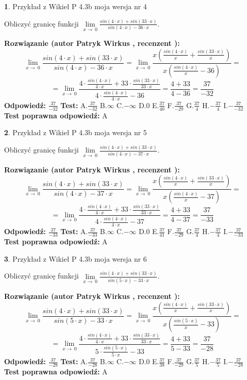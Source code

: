 \documentclass[12pt, a4paper]{article}
\theoremstyle{definition} %
\newtheorem{zad}{}
\newcommand{\zadStart}[1]{\begin{zad}#1\newline}
\newcommand{\zadStop}{\end{zad}}
\newcommand{\rozwStart}[2]{\noindent \textbf{Rozwiązanie (autor #1 , recenzent #2): }\newline}
\newcommand{\rozwStop}{\newline}
\newcommand{\odpStart}{\noindent \textbf{Odpowiedź:}\newline}
\newcommand{\odpStop}{\newline}
\newcommand{\testStart}{\noindent \textbf{Test:}\newline}
\newcommand{\testStop}{\newline}
\newcommand{\kluczStart}{\noindent \textbf{Test poprawna odpowiedź:}\newline}
\newcommand{\kluczStop}{\newline}
\begin{document}
\zadStart{Przykład z Wikieł P 4.3b moja wersja nr 4}


Obliczyć granicę funkcji $\lim\limits_{x\to\ 0}\frac{sin(4 \cdot x)+sin(33 \cdot x)}{sin(4 \cdot x)-36 \cdot x}$.
\zadStop
\rozwStart{Patryk Wirkus}{}
$$\lim\limits_{x\to\ 0}\frac{sin(4 \cdot x)+sin(33 \cdot x)}{sin(4 \cdot x)-36 \cdot x}=\lim\limits_{x\to\ 0}\frac{x(\frac{sin(4 \cdot x)}{x}+\frac{sin(33 \cdot x)}{x})}{x(\frac{sin(4 \cdot x)}{x}-36)}=$$
$$=\lim\limits_{x\to\ 0}\frac{4 \cdot \frac{sin(4 \cdot x)}{4 \cdot x}+33 \cdot \frac{sin(33 \cdot x)}{33 \cdot x}}{4 \cdot \frac{sin(4 \cdot x)}{4 \cdot x}-36}=\frac{4+33}{4-36} = \frac{37}{-32}$$
\rozwStop
\odpStart
$\frac{37}{-32}$
\odpStop
\testStart
A.$\frac{37}{-32}$
B.$\infty$
C.$-\infty$
D.$0$
E.$\frac{37}{40}$
F.$\frac{37}{-29}$
G.$\frac{37}{4}$
H.$-\frac{37}{4}$
I.$-\frac{37}{-32}$
\testStop
\kluczStart
A
\kluczStop



\zadStart{Przykład z Wikieł P 4.3b moja wersja nr 5}


Obliczyć granicę funkcji $\lim\limits_{x\to\ 0}\frac{sin(4 \cdot x)+sin(33 \cdot x)}{sin(4 \cdot x)-37 \cdot x}$.
\zadStop
\rozwStart{Patryk Wirkus}{}
$$\lim\limits_{x\to\ 0}\frac{sin(4 \cdot x)+sin(33 \cdot x)}{sin(4 \cdot x)-37 \cdot x}=\lim\limits_{x\to\ 0}\frac{x(\frac{sin(4 \cdot x)}{x}+\frac{sin(33 \cdot x)}{x})}{x(\frac{sin(4 \cdot x)}{x}-37)}=$$
$$=\lim\limits_{x\to\ 0}\frac{4 \cdot \frac{sin(4 \cdot x)}{4 \cdot x}+33 \cdot \frac{sin(33 \cdot x)}{33 \cdot x}}{4 \cdot \frac{sin(4 \cdot x)}{4 \cdot x}-37}=\frac{4+33}{4-37} = \frac{37}{-33}$$
\rozwStop
\odpStart
$\frac{37}{-33}$
\odpStop
\testStart
A.$\frac{37}{-33}$
B.$\infty$
C.$-\infty$
D.$0$
E.$\frac{37}{41}$
F.$\frac{37}{-29}$
G.$\frac{37}{4}$
H.$-\frac{37}{4}$
I.$-\frac{37}{-33}$
\testStop
\kluczStart
A
\kluczStop



\zadStart{Przykład z Wikieł P 4.3b moja wersja nr 6}


Obliczyć granicę funkcji $\lim\limits_{x\to\ 0}\frac{sin(4 \cdot x)+sin(33 \cdot x)}{sin(5 \cdot x)-33 \cdot x}$.
\zadStop
\rozwStart{Patryk Wirkus}{}
$$\lim\limits_{x\to\ 0}\frac{sin(4 \cdot x)+sin(33 \cdot x)}{sin(5 \cdot x)-33 \cdot x}=\lim\limits_{x\to\ 0}\frac{x(\frac{sin(4 \cdot x)}{x}+\frac{sin(33 \cdot x)}{x})}{x(\frac{sin(5 \cdot x)}{x}-33)}=$$
$$=\lim\limits_{x\to\ 0}\frac{4 \cdot \frac{sin(4 \cdot x)}{4 \cdot x}+33 \cdot \frac{sin(33 \cdot x)}{33 \cdot x}}{5 \cdot \frac{sin(5 \cdot x)}{5 \cdot x}-33}=\frac{4+33}{5-33} = \frac{37}{-28}$$
\rozwStop
\odpStart
$\frac{37}{-28}$
\odpStop
\testStart
A.$\frac{37}{-28}$
B.$\infty$
C.$-\infty$
D.$0$
E.$\frac{37}{38}$
F.$\frac{37}{-29}$
G.$\frac{37}{5}$
H.$-\frac{37}{5}$
I.$-\frac{37}{-28}$
\testStop
\kluczStart
A
\kluczStop
\end{document}
